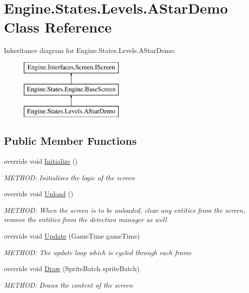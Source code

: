\hypertarget{a00562}{}\section{Engine.\+States.\+Levels.\+A\+Star\+Demo Class Reference}
\label{a00562}
Inheritance diagram for Engine.\+States.\+Levels.\+A\+Star\+Demo\+:\begin{figure}[H]
\begin{center}
\leavevmode
\includegraphics[height=3.000000cm]{d3/d2f/a00562}
\end{center}
\end{figure}
\subsection*{Public Member Functions}
\begin{DoxyCompactItemize}
\item 
override void \hyperlink{a00562_a143dfe5c81e8cd31fe6439aad1de00c6}{Initialize} ()
\begin{DoxyCompactList}\small\item\em M\+E\+T\+H\+OD\+: Initialises the logic of the screen \end{DoxyCompactList}\item 
override void \hyperlink{a00562_a25e822fbb0f806e84f05a26852c05593}{Unload} ()
\begin{DoxyCompactList}\small\item\em M\+E\+T\+H\+OD\+: When the screen is to be unloaded, clear any entities from the screen, remove the entities from the detection manager as well \end{DoxyCompactList}\item 
override void \hyperlink{a00562_aaa91f362f279bd5d226f49fb150f98e3}{Update} (Game\+Time game\+Time)
\begin{DoxyCompactList}\small\item\em M\+E\+T\+H\+OD\+: The update loop which is cycled through each frame \end{DoxyCompactList}\item 
override void \hyperlink{a00562_ad5b2061652982cb94e7c01c39f59a984}{Draw} (Sprite\+Batch sprite\+Batch)
\begin{DoxyCompactList}\small\item\em M\+E\+T\+H\+OD\+: Draws the content of the screen \end{DoxyCompactList}\end{DoxyCompactItemize}
